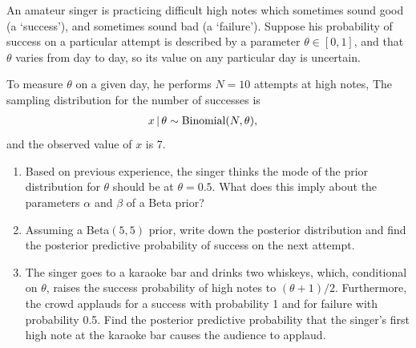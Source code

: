 \documentclass[12pt]{article}
\newcommand{\rar}{{\sffamily\textbf{Rock and roll man! }}}
\newcommand{\given}{\,|\,}
\begin{document}
\begin{Questions}
\item
An amateur singer is practicing difficult high notes which sometimes sound good
(a `success'), and sometimes sound bad (a `failure'). Suppose his probability
of success on a particular attempt is described by a parameter
$\theta \in [0, 1]$, and that $\theta$ varies from day to day, so its value
on any particular day is uncertain.

To measure $\theta$ on a given day, he performs $N=10$ attempts at high notes,
The sampling distribution for the number of
successes is
\begin{align}
x \given \theta &\sim \textnormal{Binomial}(N, \theta),
\end{align}
and the observed value of $x$ is 7.

\begin{enumerate}
\item [(a)] Based on previous experience, the singer thinks the mode
of the prior distribution for $\theta$
should be at $\theta=0.5$. What does this imply about the parameters
$\alpha$ and $\beta$ of a Beta prior?
\item [(b)] Assuming a Beta$(5, 5)$ prior,
write down the posterior distribution
and find
the posterior predictive probability of success on the next attempt.
\item [(c)] The singer goes to a karaoke bar and drinks two whiskeys, which,
conditional on $\theta$, raises the success probability of high notes to
$\left(\theta+1\right)/2$. Furthermore, the crowd applauds for a success
with probability 1 and for failure with probability 0.5.
Find the posterior predictive probability that the singer's first high note
at the karaoke bar causes the audience to applaud.
\end{enumerate} %

\end{Questions}
\end{document}
